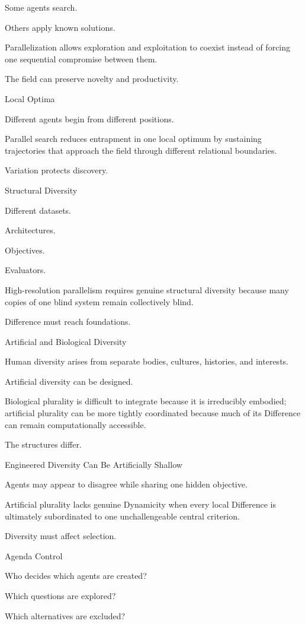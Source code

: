 Some agents search.

Others apply known solutions.

Parallelization allows exploration and exploitation to coexist instead of forcing one sequential compromise between them.

The field can preserve novelty and productivity.

Local Optima

Different agents begin from different positions.

Parallel search reduces entrapment in one local optimum by sustaining trajectories that approach the field through different relational boundaries.

Variation protects discovery.

Structural Diversity

Different datasets.

Architectures.

Objectives.

Evaluators.

High-resolution parallelism requires genuine structural diversity because many copies of one blind system remain collectively blind.

Difference must reach foundations.

Artificial and Biological Diversity

Human diversity arises from separate bodies, cultures, histories, and interests.

Artificial diversity can be designed.

Biological plurality is difficult to integrate because it is irreducibly embodied; artificial plurality can be more tightly coordinated because much of its Difference can remain computationally accessible.

The structures differ.

Engineered Diversity Can Be Artificially Shallow

Agents may appear to disagree while sharing one hidden objective.

Artificial plurality lacks genuine Dynamicity when every local Difference is ultimately subordinated to one unchallengeable central criterion.

Diversity must affect selection.

Agenda Control

Who decides which agents are created?

Which questions are explored?

Which alternatives are excluded?

